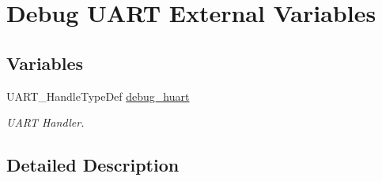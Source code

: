 \hypertarget{group___debug___u_a_r_t___external___variables}{}\section{Debug U\+A\+RT External Variables}
\label{group___debug___u_a_r_t___external___variables}
\subsection*{Variables}
\begin{DoxyCompactItemize}
\item 
U\+A\+R\+T\+\_\+\+Handle\+Type\+Def \hyperlink{group___debug___u_a_r_t___external___variables_gaa020232170a049fcc321246bd778a49f}{debug\+\_\+huart}\hypertarget{group___debug___u_a_r_t___external___variables_gaa020232170a049fcc321246bd778a49f}{}\label{group___debug___u_a_r_t___external___variables_gaa020232170a049fcc321246bd778a49f}

\begin{DoxyCompactList}\small\item\em U\+A\+RT Handler. \end{DoxyCompactList}\end{DoxyCompactItemize}


\subsection{Detailed Description}
